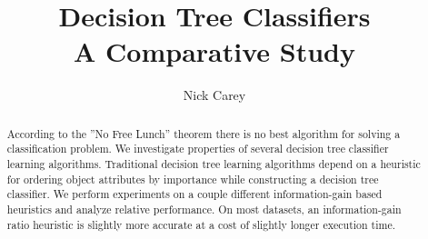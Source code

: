 \documentclass[12pt, letterpaper]{article}
\title{Decision Tree Classifiers \\ A Comparative Study}
\author{Nick Carey}
\begin{document}
\maketitle

\begin{abstract}

According to the ''No Free Lunch'' theorem \cite{noFreeLunch} there is no
best algorithm for solving a classification problem.  We investigate properties
of several decision tree classifier learning algorithms.  Traditional decision
tree learning algorithms depend on a heuristic for ordering object attributes by
importance while constructing a decision tree classifier.  We perform experiments
on a couple different information-gain based heuristics and analyze 
relative performance.  On most datasets, an information-gain ratio heuristic 
is slightly more accurate at a cost of slightly longer execution time.


\end{abstract}
\end{document}

